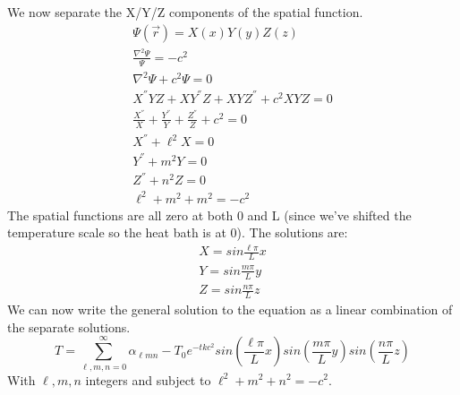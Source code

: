 \documentclass[a4paper,10pt]{article}
\numberwithin{equation}{section}
\begin{document}
We now separate the X/Y/Z components of the spatial function.
\begin{gather}
\Psi (\vec{r})=X(x)Y(y)Z(z)\\
\frac{\nabla ^2\Psi}{\Psi}=-c^2\\
\nabla ^2\Psi +c^2 \Psi =0\\
X^{''} YZ+XY^{''} Z+XYZ^{''} +c^2XYZ=0\\
\frac{X^{''} }{X}+\frac{Y^{''} }{Y}+\frac{Z^{''} }{Z}+c^2=0\\
X^{''} +\ell^2 X=0\\
Y^{''} +m^2 Y=0\\
Z^{''} +n^2 Z=0\\
\ell ^2+m^2+m^2=-c^2
\end{gather}
The spatial functions are all zero at both 0 and L (since we've shifted the temperature scale so the heat bath is at 0).
The solutions are:
\begin{gather}
 X=sin\frac{\ell\pi}{L}x\\
 Y=sin\frac{m \pi}{L}y\\
 Z=sin\frac{n \pi}{L}z
\end{gather}
We can now write the general solution to the equation as a linear combination of the separate solutions.
\begin{equation}
T=\sum _{\ell,m,n=0}^{\infty}\alpha_{\ell m n}-T_0e^{-tkc^2} sin(\frac{\ell\pi}{L}x) sin(\frac{m \pi}{L}y) sin(\frac{n \pi}{L}z)
\end{equation}
With $\ell, m, n$ integers and subject to $\ell^2+m^2+n^2=-c^2$.
\end{document}
